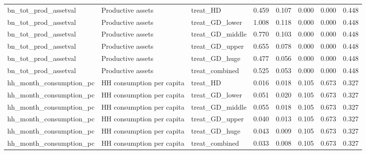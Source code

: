 \begin{tabular}{llllllll}
bn\_tot\_prod\_assetval & Productive assets & treat\_HD & 0.459 & 0.107 & 0.000 & 0.000 & 0.448 \\
bn\_tot\_prod\_assetval & Productive assets & treat\_GD\_lower & 1.008 & 0.118 & 0.000 & 0.000 & 0.448 \\
bn\_tot\_prod\_assetval & Productive assets & treat\_GD\_middle & 0.770 & 0.103 & 0.000 & 0.000 & 0.448 \\
bn\_tot\_prod\_assetval & Productive assets & treat\_GD\_upper & 0.655 & 0.078 & 0.000 & 0.000 & 0.448 \\
bn\_tot\_prod\_assetval & Productive assets & treat\_GD\_huge & 0.477 & 0.056 & 0.000 & 0.000 & 0.448 \\
bn\_tot\_prod\_assetval & Productive assets & treat\_combined & 0.525 & 0.053 & 0.000 & 0.000 & 0.448 \\
hh\_month\_consumption\_pc & HH consumption per capita & treat\_HD & 0.016 & 0.018 & 0.105 & 0.673 & 0.327 \\
hh\_month\_consumption\_pc & HH consumption per capita & treat\_GD\_lower & 0.051 & 0.020 & 0.105 & 0.673 & 0.327 \\
hh\_month\_consumption\_pc & HH consumption per capita & treat\_GD\_middle & 0.055 & 0.018 & 0.105 & 0.673 & 0.327 \\
hh\_month\_consumption\_pc & HH consumption per capita & treat\_GD\_upper & 0.040 & 0.013 & 0.105 & 0.673 & 0.327 \\
hh\_month\_consumption\_pc & HH consumption per capita & treat\_GD\_huge & 0.043 & 0.009 & 0.105 & 0.673 & 0.327 \\
hh\_month\_consumption\_pc & HH consumption per capita & treat\_combined & 0.033 & 0.008 & 0.105 & 0.673 & 0.327 \\
\bottomrule
\end{tabular}
